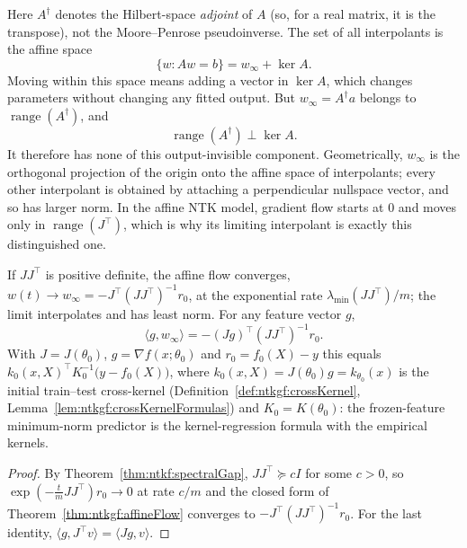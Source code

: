 \begin{remark}
  \leanok
Here $A^\dagger$ denotes the Hilbert-space \emph{adjoint} of $A$ (so, for a real matrix, it is the transpose), not the Moore--Penrose pseudoinverse. The set of all interpolants is the affine space
\[
  \{w:Aw=b\}=w_\infty+\ker A.
\]
Moving within this space means adding a vector in $\ker A$, which changes parameters without changing any fitted output.
But $w_\infty=A^\dagger a$ belongs to $\operatorname{range}(A^\dagger)$, and
\[\operatorname{range}(A^\dagger)\perp\ker A.\]
It therefore has none of this output-invisible component. Geometrically, $w_\infty$ is the orthogonal projection of the origin onto the affine space of interpolants; every other interpolant is obtained by attaching a perpendicular nullspace vector, and so has larger norm. In the affine NTK model, gradient flow starts at $0$ and moves only in $\operatorname{range}(J^\top)$, which is why its limiting interpolant is exactly this distinguished one.
\end{remark}

\begin{theorem}\label{thm:ntkgf:affineLimit}
  \leanok
If $JJ^\top$ is positive definite, the affine flow converges, $w(t)\to w_\infty=-J^\top(JJ^\top)^{-1}r_0$, at the exponential rate $\lambda_{\min}(JJ^\top)/m$; the limit interpolates and has least norm. For any feature vector $g$,
\[
  \langle g,w_\infty\rangle=-(Jg)^\top(JJ^\top)^{-1}r_0 .
\]
With $J=J(\theta_0)$, $g=\nabla f(x;\theta_0)$ and $r_0=f_0(X)-y$ this equals $k_0(x,X)^\top K_0^{-1}\bigl(y-f_0(X)\bigr)$, where $k_0(x,X)=J(\theta_0)g=k_{\theta_0}(x)$ is the initial train--test cross-kernel (Definition~\ref{def:ntkgf:crossKernel}, Lemma~\ref{lem:ntkgf:crossKernelFormulas}) and $K_0=K(\theta_0)$: the frozen-feature minimum-norm predictor is the kernel-regression formula with the empirical kernels.
\end{theorem}

\begin{proof}
  \leanok
By Theorem~\ref{thm:ntkf:spectralGap}, $JJ^\top\succeq cI$ for some $c>0$, so $\exp(-\frac tmJJ^\top)r_0\to0$ at rate $c/m$ and the closed form of Theorem~\ref{thm:ntkgf:affineFlow} converges to $-J^\top(JJ^\top)^{-1}r_0$.
For the last identity, $\langle g,J^\top v\rangle=\langle Jg,v\rangle$.
\end{proof}

